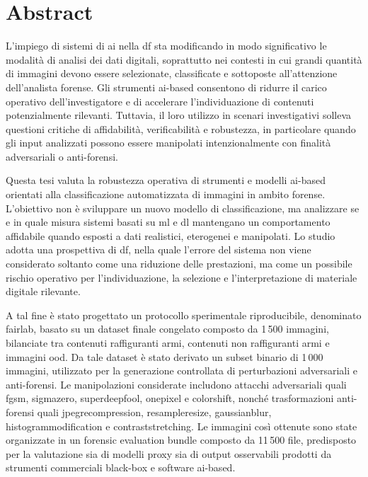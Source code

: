 \chapter*{Abstract}
\label{chap:abstract}
\thispagestyle{empty}

L'impiego di sistemi di \gls{ai} nella \gls{df} sta modificando in modo
significativo le modalità di analisi dei dati digitali, soprattutto nei contesti
in cui grandi quantità di immagini devono essere selezionate, classificate e
sottoposte all'attenzione dell'analista forense. Gli strumenti \gls{ai}-based
consentono di ridurre il carico operativo dell'investigatore e di accelerare
l'individuazione di contenuti potenzialmente rilevanti. Tuttavia, il loro
utilizzo in scenari investigativi solleva questioni critiche di affidabilità,
verificabilità e robustezza, in particolare quando gli input analizzati possono
essere manipolati intenzionalmente con finalità adversariali o anti-forensi.

Questa tesi valuta la robustezza operativa di strumenti e modelli \gls{ai}-based
orientati alla classificazione automatizzata di immagini in ambito forense.
L'obiettivo non è sviluppare un nuovo modello di classificazione, ma analizzare
se e in quale misura sistemi basati su \gls{ml} e \gls{dl} mantengano un
comportamento affidabile quando esposti a dati realistici, eterogenei e
manipolati. Lo studio adotta una prospettiva di \gls{df}, nella quale l'errore
del sistema non viene considerato soltanto come una riduzione delle prestazioni,
ma come un possibile rischio operativo per l'individuazione, la selezione e
l'interpretazione di materiale digitale rilevante.

A tal fine è stato progettato un protocollo sperimentale riproducibile,
denominato \gls{fairlab}, basato su un dataset finale congelato composto da
1\,500 immagini, bilanciate tra contenuti raffiguranti armi, contenuti non
raffiguranti armi e immagini \gls{ood}. Da tale dataset è stato derivato un
subset binario di 1\,000 immagini, utilizzato per la generazione controllata di
perturbazioni adversariali e anti-forensi. Le manipolazioni considerate
includono attacchi adversariali quali \gls{fgsm}, \gls{sigmazero},
\gls{superdeepfool}, \gls{onepixel} e \gls{colorshift}, nonché trasformazioni
anti-forensi quali \gls{jpegrecompression}, \gls{resampleresize},
\gls{gaussianblur}, \gls{histogrammodification} e
\gls{contraststretching}. Le immagini così ottenute sono state organizzate in un
forensic evaluation bundle composto da 11\,500 file, predisposto per la valutazione sia di modelli proxy sia di output osservabili
prodotti da strumenti commerciali black-box e software \gls{ai}-based.

